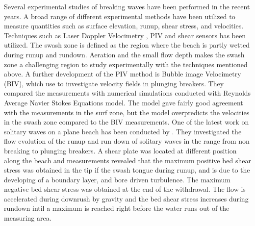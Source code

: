 \documentclass[review]{elsarticle}
\begin{document}






 Several experimental studies of breaking waves have been performed in the recent years. A broad range of different experimental methods have been utilized to measure quantities such as surface elevation, runup, shear stress, and velocities. Techniques such as Laser Doppler Velocimetry \citep{petti01}, PIV \citep{cowen03} and shear sensors \citep{Barnes09}  has been utilized. The swash zone is defined as the region where the beach is partly wetted during runup and rundown. Aeration and the 
small flow depth makes the swash zone a challenging region to study experimentally with the techniques mentioned above. A further development of the PIV method is Bubble image Velocimetry (BIV), which \cite{rivillas2012estimation} use to investigate velocity fields in plunging breakers. They compared the measurements with numerical simulations conducted with Reynolds Average Navier Stokes Equations model. The   model gave fairly good agreement with the measurements in the surf zone, but the model overpredicts the velocities in the swash zone compared to the BIV measurements. One of the latest work on solitary waves on a plane beach has been conducted by \cite{pujara2015experimental}. They investigated the flow evolution of the runup and run down of solitary waves in the range from non breaking to plunging breakers. A shear plate was located at different position along the beach and measurements revealed that the maximum positive bed shear stress was obtained in the tip if the swash tongue during runup,  and is due to the developing of a boundary layer, and bore driven turbulence. The maximum negative bed shear stress was obtained at the end of the withdrawal. The flow is accelerated during downrush by gravity and the bed shear stress increases during rundown intil a maximum is reached right before the water runs out of the measuring area.

 
 
\end{document}
